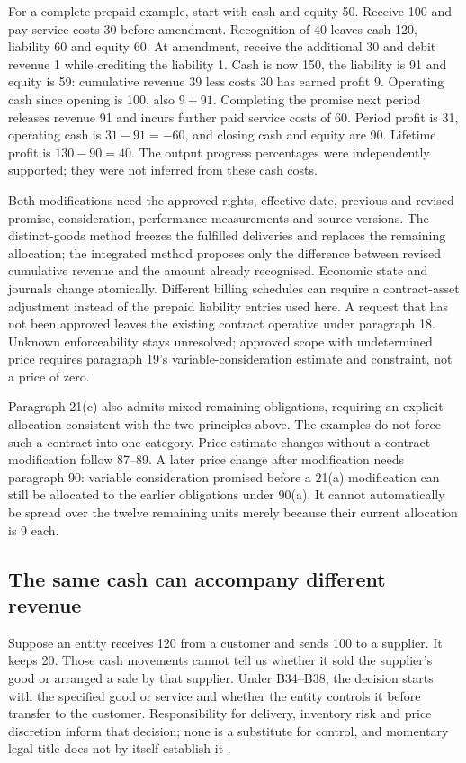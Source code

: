 For a complete prepaid example, start with cash and equity 50. Receive 100
and pay service costs 30 before amendment. Recognition of 40 leaves cash
120, liability 60 and equity 60. At amendment, receive the additional 30
and debit revenue 1 while crediting the liability 1. Cash is now 150,
the liability is 91 and equity is 59: cumulative revenue 39 less costs 30
has earned profit 9. Operating cash since opening is 100, also $9+91$.
Completing the promise next period releases revenue 91 and incurs further
paid service costs of 60. Period profit is 31, operating cash is
$31-91=-60$, and closing cash and equity are 90. Lifetime profit is
$130-90=40$. The output progress percentages were independently supported;
they were not inferred from these cash costs.

Both modifications need the approved rights, effective date, previous and
revised promise, consideration, performance measurements and source versions.
The distinct-goods method freezes the fulfilled deliveries and replaces the
remaining allocation; the integrated method proposes only the difference
between revised cumulative revenue and the amount already recognised.
Economic state and journals change atomically. Different billing schedules
can require a contract-asset adjustment instead of the prepaid liability
entries used here. A request that has not been approved leaves the existing
contract operative under paragraph 18. Unknown enforceability stays
unresolved; approved scope with undetermined price requires paragraph 19's
variable-consideration estimate and constraint, not a price of zero.

Paragraph 21(c) also admits mixed remaining obligations, requiring an explicit
allocation consistent with the two principles above. The examples do not
force such a contract into one category. Price-estimate changes without a
contract modification follow 87--89. A later price change after modification
needs paragraph 90: variable consideration promised before a 21(a)
modification can still be allocated to the earlier obligations under 90(a).
It cannot automatically be spread over the twelve remaining units merely
because their current allocation is 9 each.

\subsection{The same cash can accompany different revenue}
\label{sec:principal-agent-cash}

Suppose an entity receives 120 from a customer and sends 100 to a supplier.
It keeps 20. Those cash movements cannot tell us whether it sold the supplier's
good or arranged a sale by that supplier. Under B34--B38, the decision starts
with the specified good or service and whether the entity controls it before
transfer to the customer. Responsibility for delivery, inventory risk and
price discretion inform that decision; none is a substitute for control, and
momentary legal title does not by itself establish it \citep{aasb15dated}.

